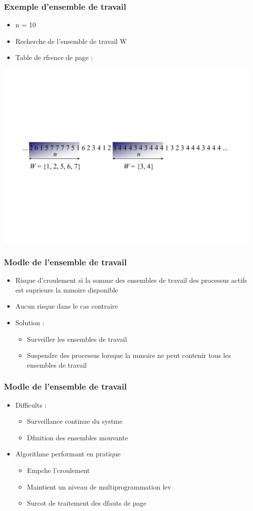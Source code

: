 \begin{frame}
\frametitle{Exemple d'ensemble de travail}
\begin{itemize}
\item n = 10
\item Recherche de l'ensemble de travail W
\item Table de rfrence de page :
\end{itemize}
\includegraphics[width=.8\textwidth]{../illustration/ensemble_travail.pdf}
\end{frame}


\begin{frame}
\frametitle{Modle de l'ensemble de travail}
\begin{itemize}
\item Risque d'croulement si la somme des ensembles de travail des processus actifs est suprieure  la mmoire disponible
\item Aucun risque dans le cas contraire
\item Solution :
\begin{itemize}
\item Surveiller les ensembles de travail
\item Suspendre des processus lorsque la mmoire ne peut contenir tous les ensembles de travail
\end{itemize}
\end{itemize}
\end{frame}


\begin{frame}
\frametitle{Modle de l'ensemble de travail}
\begin{itemize}
\item Difficults :
\begin{itemize}
\item Surveillance continue du systme
\item Dfinition des ensembles mouvante
\end{itemize}
\item Algorithme performant en pratique
\begin{itemize}
\item Empche l'croulement
\item Maintient un niveau de multiprogrammation lev
\item Surcot de traitement des dfauts de page
\end{itemize}
\end{itemize}
\end{frame}



